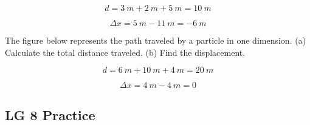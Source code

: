 \documentclass[]{exam}
\begin{document}
\begin{questions}

\begin{solution}
\begin{equation*}
    d = \SI{3}{m} + \SI{2}{m} + \SI{5}{m} = \boxed{\SI{10}{m}}
\end{equation*}

\begin{equation*}
    \Delta x = \SI{5}{m} - \SI{11}{m} = \boxed{\SI{-6}{m}}
\end{equation*}
\end{solution}

\question
The figure below represents the path traveled by a particle in one dimension. (a) Calculate the total distance traveled. (b) Find the displacement.


\begin{solution}
\begin{equation*}
    d = \SI{6}{m} + \SI{10}{m} + \SI{4}{m} = \boxed{\SI{20}{m}}
\end{equation*}

\begin{equation*}
    \Delta x = \SI{4}{m} - \SI{4}{m} = \boxed{0}
\end{equation*}
\end{solution}

\end{questions}

\ifprintanswers \clearpage \fi



\subsection*{LG 8 Practice}
\end{document}
